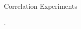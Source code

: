 \documentclass[final,t]{beamer}
\newcommand{\cmark}{\ding{51}}%
\newcommand{\xmark}{\ding{55}}%
\begin{document}
\begin{frame}{}
\begin{columns}[t]
\begin{column}{.32\linewidth}
\begin{exampleblock}{Correlation Experiments}
%
   \end{exampleblock}
    .\\
    
  \footnotesize
  
\end{column}

\end{columns}
\end{frame}
\end{document}
